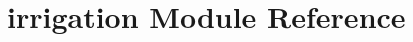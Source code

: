 \hypertarget{namespaceirrigation}{
\section{irrigation Module Reference}
\label{namespaceirrigation}
}
